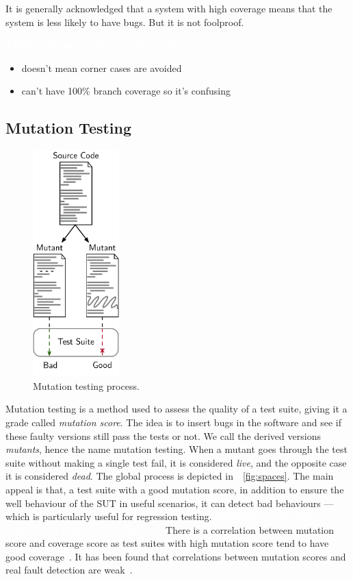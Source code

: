 \documentclass[11pt]{sdm_internship}
\newcommand{\todo}[1]{\colorbox{Red!75}{\textcolor{white}{\textbf{TODO\ifx&#1&\else: #1\fi}}}}
\theoremstyle{definition}
\begin{document}
It is generally acknowledged that a system with high coverage means that the system is less likely to have bugs.
But it is not foolproof.

\todo{What are their limits}
\begin{itemize}
  \item doesn't mean corner cases are avoided
  \item can't have 100\% branch coverage so it's confusing
\end{itemize}

\subsection{Mutation Testing}%
\label{ssec:mutation_testing}
\begin{figure}
  \centering
  \includegraphics[width=9em]{mutation_testing_report}
  \caption{Mutation testing process.}%
\label{fig:mutation_testing}
\end{figure}
Mutation testing is a method used to assess the quality of a test suite, giving it a grade called \textit{mutation score}.
The idea is to insert bugs in the software and see if these faulty versions still pass the tests or not.
We call the derived versions \textit{mutants}, hence the name mutation testing.
When a mutant goes through the test suite without making a single test fail, it is considered \emph{live}, and the opposite case it is considered \emph{dead}.
The global process is depicted in~\figurename~\ref{fig:spaces}.
The main appeal is that, a test suite with a good mutation score, in addition to ensure the well behaviour of the SUT in useful scenarios, it can detect bad behaviours --- which is particularly useful for regression testing.
\todo{rework that sentence}
There is a correlation between mutation score and coverage score as test suites with high mutation score tend to have good coverage~\cite{assylbekov2013investigating}.
It has been found that correlations between mutation scores and real fault detection are weak~\cite{papadakis2018mutation}.
\end{document}
